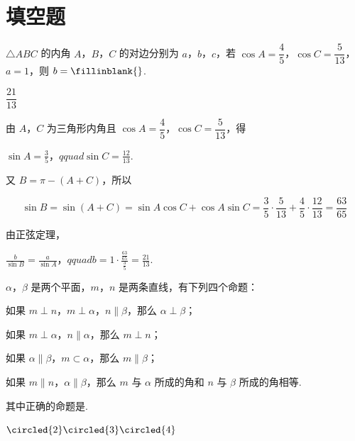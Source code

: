 \section{填空题}

\begin{problem}
\(\triangle ABC\) 的内角 \(A\)，\(B\)，\(C\) 的对边分别为 \(a\)，\(b\)，\(c\)，若 \(\cos A=\dfrac45\)，\(\cos C=\dfrac{5}{13}\)，\(a=1\)，则 \(b=\fillinblank{}\).
\end{problem}

\begin{answer}
\(\dfrac{21}{13}\)
\end{answer}

\begin{solution}
由 \(A\)，\(C\) 为三角形内角且 \(\cos A=\dfrac45\)，\(\cos C=\dfrac5{13}\)，得

\(\sin A=\frac35\)，\(qquad \sin C=\frac{12}{13}\).

又 \(B=\pi-(A+C)\)，所以

\[
\sin B=\sin(A+C)=\sin A\cos C+\cos A\sin C
=\frac35\cdot\frac5{13}+\frac45\cdot\frac{12}{13}=\frac{63}{65}
\]

由正弦定理，

\(\frac b{\sin B}=\frac a{\sin A}\)，\(qquad b=1\cdot\frac{\frac{63}{65}}{\frac{3}{5}}=\frac{21}{13}\).

\end{solution}


\begin{problem}
\(\alpha\)，\(\beta\) 是两个平面，\(m\)，\(n\) 是两条直线，有下列四个命题：
\begin{circlelist}
\item 如果 \(m\perp n\)，\(m\perp\alpha\)，\(n\parallel\beta\)，那么 \(\alpha\perp\beta\)；
\item 如果 \(m\perp\alpha\)，\(n\parallel\alpha\)，那么 \(m\perp n\)；
\item 如果 \(\alpha\parallel\beta\)，\(m\subset\alpha\)，那么 \(m\parallel\beta\)；
\item 如果 \(m\parallel n\)，\(\alpha\parallel\beta\)，那么 \(m\) 与 \(\alpha\) 所成的角和 \(n\) 与 \(\beta\) 所成的角相等.
\end{circlelist}
其中正确的命题是\fillinblank{}.
\end{problem}

\begin{answer}
\(\circled{2}\circled{3}\circled{4}\)
\end{answer}

